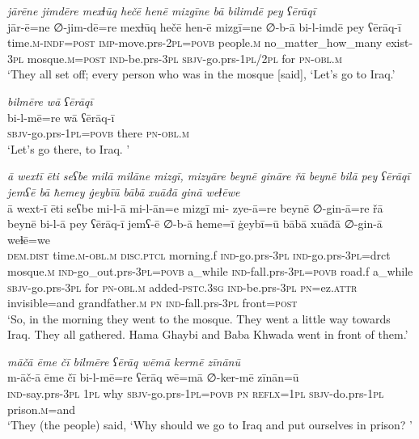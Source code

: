 \ea \label{BP.87}
\textit{jārēne jimdēre mexɫūq hečē henē mizgīne bā bilimdē pey ʕērāqī} \\ 
\gll jār-ē=ne ∅-jim-dē=re mexɫūq hečē hen-ē mizgī=ne ∅-b-ā bi-l-imdē pey ʕērāq-ī \\ 
 time\textsc{.m}\textsc{-indf}\textsc{=\textsc{post}} \textsc{imp-}move.prs-\textsc{2pl}\textsc{=\textsc{povb}} people\textsc{.m} no\_matter\_how\_many exist\textsc{-3pl} mosque\textsc{.m}\textsc{=\textsc{post}} \textsc{ind-}be.prs\textsc{-3pl} \textsc{sbjv-}go.prs\textsc{-\textsc{1pl}}/\textsc{2pl} for \textsc{pn}\textsc{-obl}\textsc{.m} \\ 
\glt `They all set off; every person who was in the mosque [said], ‘Let’s go to Iraq.'
\z 
 
\ea \label{BP.88}
\textit{bilmēre wā ʕērāqī} \\ 
\gll bi-l-mē=re wā ʕērāq-ī \\ 
 \textsc{sbjv-}go.prs\textsc{-\textsc{1pl}}\textsc{=\textsc{povb}} there \textsc{pn}\textsc{-obl}\textsc{.m} \\ 
\glt `Let’s go there, to Iraq. '
\z 
 
\ea \label{BP.98}
\textit{ā wextī ēti seʕbe milā milāne mizgī, mizyāre beynē gināre řā beynē bilā pey ʕērāqī jemʕē bā ħemey ġeybīū bābā xuāđā ginā weɫēwe} \\ 
\gll ā wext-ī ēti seʕbe mi-l-ā mi-l-ān=e mizgī mi- zye-ā=re beynē ∅-gin-ā=re řā beynē bi-l-ā pey ʕērāq-ī jemʕ-ē ∅-b-ā ħeme=ī ġeybī=ū bābā xuāđā ∅-gin-ā weɫē=we \\ 
 \textsc{dem.dist} time\textsc{.m}\textsc{-obl}\textsc{.m} \textsc{disc.ptcl} morning.f \textsc{ind-}go.prs\textsc{-3pl} \textsc{ind-}go.prs\textsc{-3pl}=drct mosque\textsc{.m} \textsc{ind-}go\_out.prs\textsc{-3pl}\textsc{=\textsc{povb}} a\_while \textsc{ind-}fall.prs\textsc{-3pl}\textsc{=\textsc{povb}} road.f a\_while \textsc{sbjv-}go.prs\textsc{-3pl} for \textsc{pn}\textsc{-obl}\textsc{.m} added\textsc{-pstc}\textsc{.3sg} \textsc{ind-}be.prs\textsc{-3pl} \textsc{pn}=ez.\textsc{attr} invisible=and grandfather\textsc{.m} \textsc{pn} \textsc{ind-}fall.prs\textsc{-3pl} front\textsc{=\textsc{post}} \\ 
\glt `So, in the morning they went to the mosque. They went a little way towards Iraq. They all gathered. Hama Ghaybi and Baba Khwada went in front of them.'
\z 
 
\ea \label{BP.101}
\textit{māčā ēme čī bilmēre ʕērāq wēmā kermē zīnānū} \\ 
\gll m-āč-ā ēme čī bi-l-mē=re ʕērāq wē=mā ∅-ker-mē zīnān=ū \\ 
 \textsc{ind-}say.prs\textsc{-3pl} \textsc{1pl} why \textsc{sbjv-}go.prs\textsc{-\textsc{1pl}}\textsc{=\textsc{povb}} \textsc{pn} \textsc{reflx}\textsc{=\textsc{1pl}} \textsc{sbjv-}do.prs\textsc{-\textsc{1pl}} prison\textsc{.m}=and \\ 
\glt `They (the people) said, ‘Why should we go to Iraq and put ourselves in   prison? '
\z 
 

